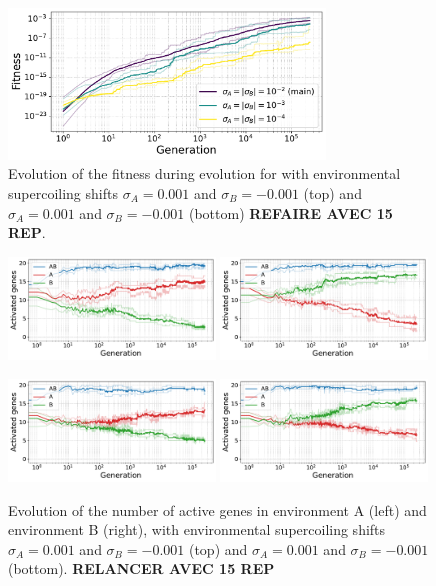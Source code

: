 \begin{figure}
\centering
\includegraphics[width=0.75\textwidth]{param/sigma/fitness_all_with_main.pdf}
\caption{Evolution of the fitness during evolution for with environmental supercoiling shifts $\sigma_A = 0.001$ and $\sigma_B = -0.001$ (top) and $\sigma_A = 0.001$ and $\sigma_B = -0.001$ (bottom) \textbf{REFAIRE AVEC 15 REP}.}
\end{figure}


\begin{figure}
\includegraphics[width=0.49\textwidth]{param/sigma/sigma-1e-3/gene_activity_env_A.pdf}
\includegraphics[width=0.49\textwidth]{param/sigma/sigma-1e-3/gene_activity_env_B.pdf}

\includegraphics[width=0.49\textwidth]{param/sigma/sigma-1e-4/gene_activity_env_A.pdf}
\includegraphics[width=0.49\textwidth]{param/sigma/sigma-1e-4/gene_activity_env_B.pdf}
\caption[Evolution of the number of active genes in each environment with an absolute environmental supercoiling shift of 0.001 or 0.0001]{Evolution of the number of active genes in environment A (left) and environment B (right), with environmental supercoiling shifts $\sigma_A = 0.001$ and $\sigma_B = -0.001$ (top) and $\sigma_A = 0.001$ and $\sigma_B = -0.001$ (bottom). \textbf{RELANCER AVEC 15 REP}}
\label{}
\end{figure}

